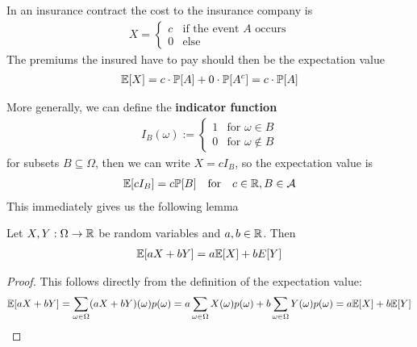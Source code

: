 \begin{ex}[]
  In an insurance contract the cost to the insurance company is
  \begin{align*}
    X = \left\{\begin{array}{ll}
      c & \text{if the event $A$ occurs} \\
      0 & \text{else}
    \end{array} \right.
  \end{align*}
  The premiums the insured have to pay should then be the expectation value
  \begin{align*}
    \mathbb{E}[X] = c \cdot \mathbb{P}[A] + 0 \cdot \mathbb{P}[A^{c}] = c \cdot \mathbb{P}[A]
  \end{align*}
\end{ex}
More generally, we can define the \textbf{indicator function}
\begin{align*}
  I_B(\omega) := \left\{\begin{array}{ll}
      1 & \text{for } \omega \in B \\
     0 & \text{for } \omega \notin B
  \end{array} \right.
\end{align*}
  for subsets $B \subseteq \Omega$, then we can write $X = c I_B$, so the expectation value is
  \begin{align*}
    \mathbb{E}[cI_B] = c \mathbb{P}[B] \quad \text{for} \quad c \in \mathbb{R}, B \in \mathcal{A}
  \end{align*}
This immediately gives us the following lemma

\begin{lem}
  Let $X,Y: \Omega \to \mathbb{R}$ be random variables and $a,b \in \mathbb{R}$. Then
  \begin{align*}
    \mathbb{E}[aX + bY] = a\mathbb{E}[X] + bE[Y]
  \end{align*}
\end{lem}
\begin{proof}
  This follows directly from the definition of the expectation value:
  \begin{align*}
    \mathbb{E}[aX + bY] 
    = \sum_{\omega \in \Omega}(aX + bY)(\omega) p(\omega) 
    = a\sum_{\omega \in \Omega}X(\omega) p(\omega) + b \sum_{\omega \in \Omega}Y(\omega) p(\omega)
    =a\mathbb{E}[X] + b\mathbb{E}[Y]
  \end{align*}
\end{proof}

